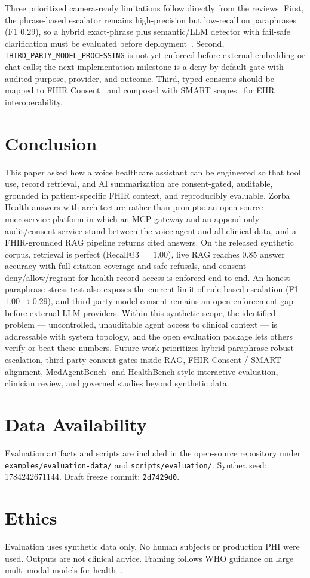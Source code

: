\documentclass[conference]{IEEEtran}
\begin{document}
Three prioritized camera-ready limitations follow directly from the reviews.
First, the phrase-based escalator remains high-precision but low-recall on paraphrases (F1 $0.29$), so a hybrid exact-phrase plus semantic/LLM detector with fail-safe clarification must be evaluated before deployment~\cite{deng2025psycrisisbench,arnaiz2026crisis}.
Second, \texttt{THIRD\_PARTY\_MODEL\_PROCESSING} is not yet enforced before external embedding or chat calls; the next implementation milestone is a deny-by-default gate with audited purpose, provider, and outcome.
Third, typed consents should be mapped to FHIR Consent~\cite{hl7fhirconsent} and composed with SMART scopes~\cite{smartapplaunch22} for EHR interoperability.

\section{Conclusion}
This paper asked how a voice healthcare assistant can be engineered so that tool use, record retrieval, and AI summarization are consent-gated, auditable, grounded in patient-specific FHIR context, and reproducibly evaluable.
Zorba Health answers with architecture rather than prompts: an open-source microservice platform in which an MCP gateway and an append-only audit/consent service stand between the voice agent and all clinical data, and a FHIR-grounded RAG pipeline returns cited answers.
On the released synthetic corpus, retrieval is perfect (Recall@3 $= 1.00$), live RAG reaches $0.85$ answer accuracy with full citation coverage and safe refusals, and consent deny/allow/regrant for health-record access is enforced end-to-end.
An honest paraphrase stress test also exposes the current limit of rule-based escalation (F1 $1.00 \rightarrow 0.29$), and third-party model consent remains an open enforcement gap before external LLM providers.
Within this synthetic scope, the identified problem --- uncontrolled, unauditable agent access to clinical context --- is addressable with system topology, and the open evaluation package lets others verify or beat these numbers.
Future work prioritizes hybrid paraphrase-robust escalation, third-party consent gates inside RAG, FHIR Consent / SMART alignment, MedAgentBench- and HealthBench-style interactive evaluation, clinician review, and governed studies beyond synthetic data.

\section*{Data Availability}
Evaluation artifacts and scripts are included in the open-source repository under \texttt{examples/evaluation-data/} and \texttt{scripts/evaluation/}.
Synthea seed: 1784242671144.
Draft freeze commit: \texttt{2d7429d0}.

\section*{Ethics}
Evaluation uses synthetic data only. No human subjects or production PHI were used. Outputs are not clinical advice.
Framing follows WHO guidance on large multi-modal models for health~\cite{who2024lmm}.



\end{document}
